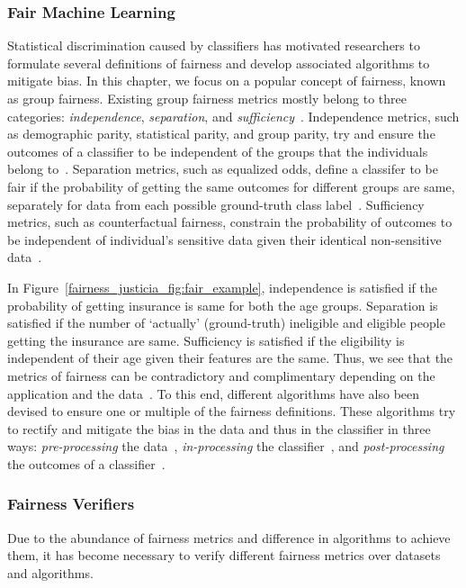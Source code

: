 \subsubsection{Fair Machine Learning} Statistical discrimination caused by classifiers has motivated researchers to formulate several definitions of fairness and develop associated algorithms to mitigate bias. In this chapter, we focus on a popular concept of fairness, known as group fairness. Existing group fairness metrics mostly belong to three categories: \textit{independence}, \textit{separation}, and \textit{sufficiency}~\cite{mehrabi2019survey}. Independence metrics, such as demographic parity, statistical parity, and group parity, try and ensure the outcomes of a classifier to be independent of the groups that the individuals belong to~\cite{feldman2015certifying,dwork2012fairness}. Separation metrics, such as equalized odds, define a classifer to be fair if the probability of getting the same outcomes for different groups are same, separately for data from each possible ground-truth class label~\cite{hardt2016equality}. Sufficiency metrics, such as counterfactual fairness, constrain the probability of outcomes to be independent of individual's sensitive data given their identical non-sensitive data~\cite{kusner2017counterfactual}.

In Figure~\ref{fairness_justicia_fig:fair_example}, independence is satisfied if the probability of getting insurance is same for both the age groups. Separation is satisfied if the number of `actually' (ground-truth) ineligible and eligible people getting the insurance are same. Sufficiency is satisfied if the eligibility is independent of their age given their features are the same. Thus, we see that the metrics of fairness can be contradictory and complimentary depending on the application and the data~\cite{corbett2018measure}. To this end, different algorithms have also been devised to ensure one or multiple of the fairness definitions. These algorithms try to rectify and mitigate the bias in the data and thus in the classifier in three ways: \textit{pre-processing} the data~\cite{kamiran2012data,zemel2013learning,calmon2017optimized}, \textit{in-processing} the classifier~\cite{zhang2018mitigating}, and \textit{post-processing} the outcomes of a classifier~\cite{kamiran2012decision,hardt2016equality}.

\subsubsection{Fairness Verifiers} Due to the abundance of fairness metrics and difference in algorithms to achieve them, it has become necessary to verify different fairness metrics over datasets and algorithms. 

